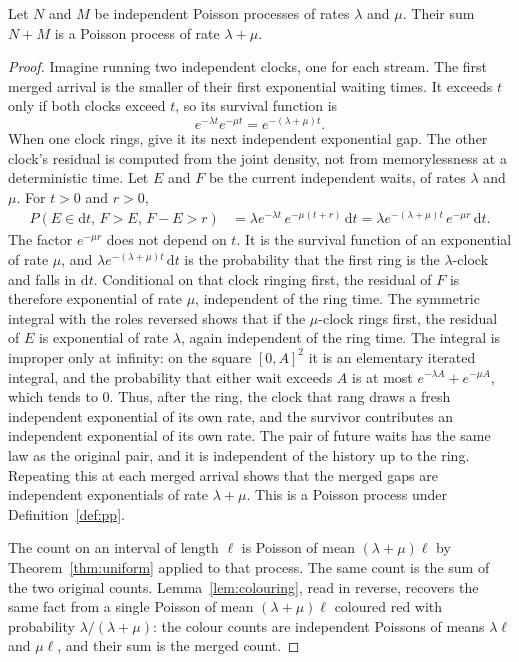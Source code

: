 \begin{theorem}[superposition]\label{thm:superpose}
Let $N$ and $M$ be independent Poisson processes of rates $\lambda$ and $\mu$. Their sum $N+M$ is a Poisson process of rate $\lambda+\mu$.
\end{theorem}
\begin{proof}
Imagine running two independent clocks, one for each stream. The first merged arrival is the smaller of their first exponential waiting times. It exceeds $t$ only if both clocks exceed $t$, so its survival function is
\[
 e^{-\lambda t}e^{-\mu t}=e^{-(\lambda+\mu)t}.
\]
When one clock rings, give it its next independent exponential gap. The other clock's residual is computed from the joint density, not from memorylessness at a deterministic time. Let $E$ and $F$ be the current independent waits, of rates $\lambda$ and $\mu$. For $t>0$ and $r>0$,
\begin{align*}
 P(E\in\mathrm dt,\,F>E,\,F-E>r)
 &=\lambda e^{-\lambda t}\,e^{-\mu(t+r)}\,\mathrm dt
 =\lambda e^{-(\lambda+\mu)t}\,e^{-\mu r}\,\mathrm dt.
\end{align*}
The factor $e^{-\mu r}$ does not depend on $t$. It is the survival function of an exponential of rate $\mu$, and $\lambda e^{-(\lambda+\mu)t}\,\mathrm dt$ is the probability that the first ring is the $\lambda$-clock and falls in $\mathrm dt$. Conditional on that clock ringing first, the residual of $F$ is therefore exponential of rate $\mu$, independent of the ring time. The symmetric integral with the roles reversed shows that if the $\mu$-clock rings first, the residual of $E$ is exponential of rate $\lambda$, again independent of the ring time. The integral is improper only at infinity: on the square $[0,A]^2$ it is an elementary iterated integral, and the probability that either wait exceeds $A$ is at most $e^{-\lambda A}+e^{-\mu A}$, which tends to $0$. Thus, after the ring, the clock that rang draws a fresh independent exponential of its own rate, and the survivor contributes an independent exponential of its own rate. The pair of future waits has the same law as the original pair, and it is independent of the history up to the ring. Repeating this at each merged arrival shows that the merged gaps are independent exponentials of rate $\lambda+\mu$. This is a Poisson process under Definition~\ref{def:pp}.

The count on an interval of length $\ell$ is Poisson of mean $(\lambda+\mu)\ell$ by Theorem~\ref{thm:uniform} applied to that process. The same count is the sum of the two original counts. Lemma~\ref{lem:colouring}, read in reverse, recovers the same fact from a single Poisson of mean $(\lambda+\mu)\ell$ coloured red with probability $\lambda/(\lambda+\mu)$: the colour counts are independent Poissons of means $\lambda\ell$ and $\mu\ell$, and their sum is the merged count.
\end{proof}

